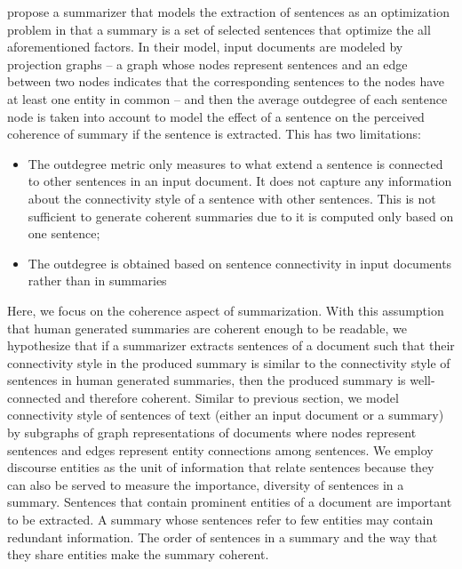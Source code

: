  
 propose a summarizer that models the extraction of sentences as an optimization problem in that a summary is a set of selected sentences that optimize the all aforementioned factors. 
In their model, input documents are modeled by projection graphs \cite{} -- a graph whose nodes represent sentences and an edge between two nodes indicates that the corresponding sentences to the nodes have at least one entity in common -- and then the average outdegree of each sentence node is taken into account to model the effect of a sentence on the perceived coherence of summary if the sentence is extracted.  
This has two limitations: 

\begin{itemize}
	\item The outdegree metric only measures to what extend a sentence is connected to other sentences in an input document. 
	It does not capture any information about the connectivity style of a sentence with other sentences. 
	This is not sufficient to generate coherent summaries due to it is computed only based on one sentence;

	\item The outdegree is obtained based on sentence connectivity in input documents rather than in summaries 

\end{itemize} 

Here, we focus on the coherence aspect of summarization. 
With this assumption that human generated summaries are coherent enough to be readable, we hypothesize that if a summarizer extracts sentences of a document such that their connectivity style in the produced summary is similar to the connectivity style of sentences in human generated summaries, then the produced summary is well-connected and therefore coherent.  
Similar to previous section, we model connectivity style of sentences of text (either an input document or a summary) by subgraphs of graph representations of documents where nodes represent sentences and edges represent entity connections among sentences.
We employ discourse entities as the unit of information that relate sentences because they can also be served to measure the importance, diversity of sentences in a summary. 
Sentences that contain prominent entities of a document are important to be extracted. 
A summary whose sentences refer to few entities may contain redundant information. 
The order of sentences in a summary and the way that they share entities make the summary coherent. 

